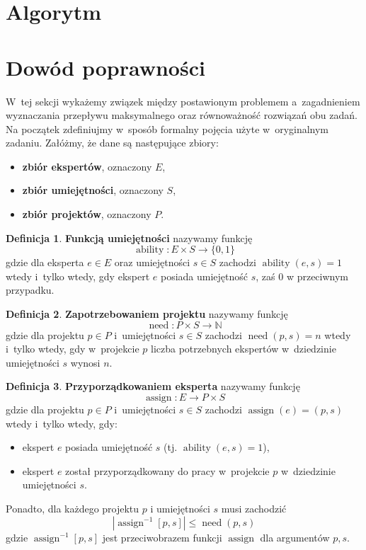 \documentclass[12pt,a4paper]{article}
\theoremstyle{definition}
\newtheorem{defn}{Definicja}
\DeclareMathOperator{\ability}{ability}
\DeclareMathOperator{\need}{need}
\DeclareMathOperator{\assign}{assign}
\begin{document}
\section{Algorytm}
\label{sec:algorithm}

\section{Dowód poprawności}
\label{sec:correctnessproof}

W~tej sekcji wykażemy związek między postawionym problemem a~zagadnieniem
wyznaczania przepływu maksymalnego oraz równoważność rozwiązań obu zadań.\\

\noindent
Na początek zdefiniujmy w~sposób formalny pojęcia użyte w~oryginalnym zadaniu.
Załóżmy, że dane są następujące zbiory:

\begin{itemize}
	\item \textbf{zbiór ekspertów}, oznaczony $E$,
	\item \textbf{zbiór umiejętności}, oznaczony $S$,
	\item \textbf{zbiór projektów}, oznaczony $P$.
\end{itemize}

\begin{defn}
\textbf{Funkcją umiejętności} nazywamy funkcję
$$ \ability : E \times S \to \{ 0,1 \} $$
gdzie dla eksperta $e \in E$ oraz umiejętności $s \in S$ zachodzi
$\ability(e, s) = 1$ wtedy i~tylko wtedy, gdy ekspert $e$ posiada umiejętność
$s$, zaś 0 w przeciwnym przypadku.
\end{defn}

\begin{defn}
\textbf{Zapotrzebowaniem projektu} nazywamy funkcję
$$ \need : P \times S \to \mathbb{N} $$
gdzie dla projektu $p \in P$ i~umiejętności $s \in S$ zachodzi $\need(p, s) = n$
wtedy i~tylko wtedy, gdy w~projekcie $p$ liczba potrzebnych ekspertów
w~dziedzinie umiejętności $s$ wynosi $n$.
\end{defn}

\begin{defn}
\textbf{Przyporządkowaniem eksperta} nazywamy funkcję
$$ \assign : E \to P \times S $$
gdzie dla projektu $p \in P$ i~umiejętności $s \in S$ zachodzi
$\assign(e) = (p,s)$ wtedy i~tylko wtedy, gdy:
\begin{itemize}
	\item ekspert $e$ posiada umiejętność $s$ (tj. $\ability(e,s) = 1$),
	\item ekspert $e$ został przyporządkowany do pracy w~projekcie $p$
	w~dziedzinie umiejętności $s$.
\end{itemize}
Ponadto, dla każdego projektu $p$ i umiejętności $s$ musi zachodzić
$$ \left| \assign^{-1}[p,s] \right| \leq \need(p,s) $$
gdzie $\assign^{-1}[p,s]$ jest przeciwobrazem funkcji $\assign$ dla argumentów
$p,s$.
\end{defn}
\end{document}

